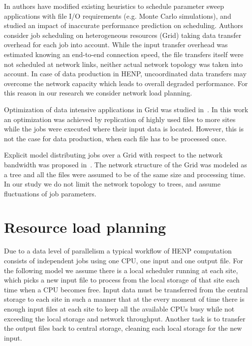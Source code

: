 \documentclass[english]{ddny}
\begin{document}

In \cite{casanova2000heuristics} authors have modified existing heuristics  to schedule parameter sweep applications with file I/O requirements (e.g. Monte Carlo simulations), and studied an impact of inaccurate performance prediction on scheduling. Authors consider job scheduling on heterogeneous resources (Grid) taking data transfer overhead for each job into account. While the input transfer overhead was estimated knowing an end-to-end connection speed, the file transfers itself were not scheduled at network links, neither actual network topology was taken into account. In case of data production in HENP, uncoordinated data transfers may overcome the network capacity which leads to overall degraded performance. For this reason in our research we consider network load planning.

Optimization of data intensive applications in Grid was studied
in~\cite{Globus_scheduler}. In this work an optimization was achieved by
replication of highly used files to more sites while the jobs were executed
where their input data is located. However, this is not the case for data
production, when each file has to be processed once. 

Explicit model distributing jobs over a Grid with respect to the network
bandwidth was proposed in~\cite{Trees}. The network structure of the Grid was
modeled as a tree and all the files were assumed to be of the same size and
processing time. In our study we do not limit the network topology to trees,
and assume fluctuations of job parameters. 



\section{Resource load planning}
\label{Network_flow}
Due to a data level of parallelism a typical workflow of HENP computation
consists of independent jobs using one CPU, one input and one output file. For the following model we assume there is a local scheduler running at each site, which picks a new
input file to process from the local storage of that site each time when a CPU becomes
free. Input data must be transferred from the central storage
to each site in such a manner that at the every moment of time there is enough
input files at each site to keep all the available CPUs busy while not
exceeding the local storage and network throughput. Another task
is to transfer the output files back to central storage, cleaning each local
storage for the new input.
\end{document}
